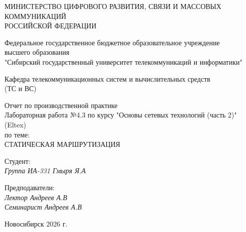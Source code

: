 \thispagestyle{empty}

\begin{center}
    МИНИСТЕРСТВО ЦИФРОВОГО РАЗВИТИЯ, СВЯЗИ И МАССОВЫХ КОММУНИКАЦИЙ \\ РОССИЙСКОЙ ФЕДЕРАЦИИ

    \vspace{20pt}

    Федеральное государственное бюджетное образовательное учреждение  \\  высшего образования \\
    "Сибирский государственный университет телекоммуникаций и информатики" \\

    \vspace{20pt}

    Кафедра телекоммуникационных систем и вычислительных средств \\  (ТС и ВС)
\end{center}

\vfill

\begin{center}
    Отчет по производственной практике \\  
    Лабораторная работа №4.3 по курсу "Основы сетевых технологий (часть 2)" (Eltex) \\
    \vspace{20pt}
    по теме: \\
    \uppercase{Статическая маршрутизация}
\end{center}

\vfill

    \noindent Студент: \\
    \textit{Группа ИА-331 \hfill Гмыря Я.А} 

    \vspace{20pt}
 
    \noindent Предподаватели: \\
    \textit{Лектор \hfill Андреев А.В} \\
    \textit{Семинарист \hfill Андреев А.В}

\vfill

\begin{center}
    Новосибирск 2026 г.
\end{center}